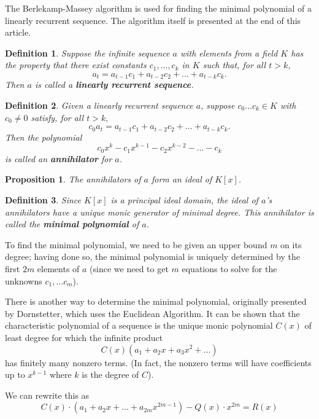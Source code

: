 \documentclass[12pt]{article}
\newtheorem{proposition}{Proposition}
\newtheorem{definition}{Definition}
\begin{document}
The Berlekamp-Massey algorithm is used for finding the minimal polynomial of a linearly recurrent sequence. The algorithm itself is presented at the end of this article.

\begin{definition}
Suppose the infinite sequence $a$ with elements from a field $K$ has the property that there exist constants $c_1, \ldots, c_k$ in $K$ such that, for all $t > k$, 
        $$a_t = a_{t-1}c_1 + a_{t-2}c_2 + ... + a_{t-k}c_k.$$
Then $a$ is called a {\textbf{linearly recurrent sequence}}.
\end{definition}

\begin{definition}
Given a linearly recurrent sequence $a$, suppose $c_0 \ldots c_k \in K$ with $c_0 \neq 0$ satisfy, for all $t>k, $
        $$c_0a_t = a_{t-1}c_1 + a_{t-2}c_2 + ... + a_{t-k}c_k.$$
Then the polynomial $$c_0x^k - c_1x^{k-1} - c_2x^{k-2} - ... - c_k$$ is called an \textbf{annihilator} for $a$.
\end{definition}

\begin{proposition}
The annihilators of $a$ form an ideal of $K[x]$.
\end{proposition}

\begin{definition}
Since $K[x]$ is a principal ideal domain, the ideal of $a$'s annihilators have a unique monic generator of minimal degree. This annihilator is called the {\textbf{minimal polynomial}} of $a$.
\end{definition}

To find the minimal polynomial, we need to be given an upper bound $m$ on its degree; having done so, the minimal polynomial is uniquely determined by the first $2m$ elements of $a$ (since we need to get $m$ equations to solve for the unknowns $c_1, \ldots c_m$).



There is another way to determine the minimal polynomial, originally presented by Dornstetter, which uses the Euclidean Algorithm. It can be shown that the characteristic polynomial of a sequence is the unique monic polynomial $C(x)$ of least degree for which the infinite product
 $$C(x)(a_1 + a_2x + a_3x^2 + ...)$$
has finitely many nonzero terms. (In fact, the nonzero terms will have coefficients up to $x^{k-1}$ where $k$ is the degree of $C$). 

We can rewrite this as
$$C(x)\cdot(a_1 + a_2x + ... + a_{2m}x^{2m-1}) - Q(x)\cdot x^{2m} = R(x) $$
\end{document}
